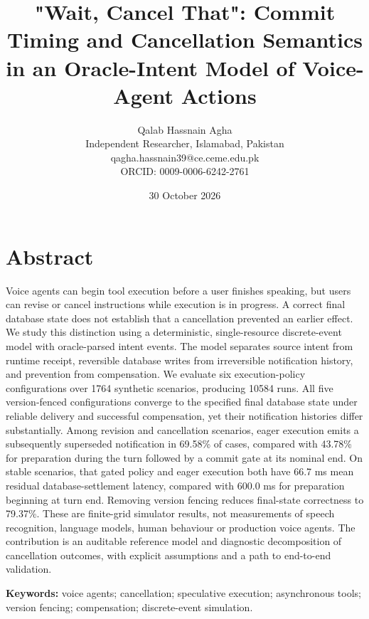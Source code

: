 \documentclass[10pt]{article}
\begin{document}
\title{"Wait, Cancel That": Commit Timing and Cancellation Semantics in an Oracle-Intent Model of Voice-Agent Actions}
\author{Qalab Hassnain Agha\\Independent Researcher, Islamabad, Pakistan\\qagha.hassnain39@ce.ceme.edu.pk\\ORCID: 0009-0006-6242-2761}
\date{30 October 2026}
\maketitle

\section*{Abstract}

Voice agents can begin tool execution before a user finishes speaking, but users can revise or cancel instructions while execution is in progress. A correct final database state does not establish that a cancellation prevented an earlier effect. We study this distinction using a deterministic, single-resource discrete-event model with oracle-parsed intent events. The model separates source intent from runtime receipt, reversible database writes from irreversible notification history, and prevention from compensation. We evaluate six execution-policy configurations over 1764 synthetic scenarios, producing 10584 runs. All five version-fenced configurations converge to the specified final database state under reliable delivery and successful compensation, yet their notification histories differ substantially. Among revision and cancellation scenarios, eager execution emits a subsequently superseded notification in 69.58\% of cases, compared with 43.78\% for preparation during the turn followed by a commit gate at its nominal end. On stable scenarios, that gated policy and eager execution both have 66.7 ms mean residual database-settlement latency, compared with 600.0 ms for preparation beginning at turn end. Removing version fencing reduces final-state correctness to 79.37\%. These are finite-grid simulator results, not measurements of speech recognition, language models, human behaviour or production voice agents. The contribution is an auditable reference model and diagnostic decomposition of cancellation outcomes, with explicit assumptions and a path to end-to-end validation.


\textbf{Keywords:} voice agents; cancellation; speculative execution; asynchronous tools; version fencing; compensation; discrete-event simulation.
\end{document}
